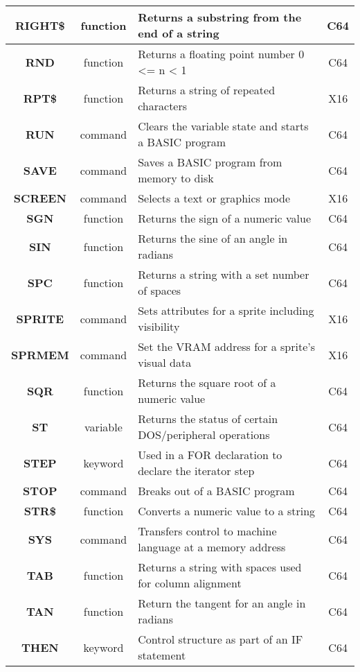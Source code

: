 \begin{longtable}{|c|c|m{4cm}|c|}
	{\bfseries RIGHT\$} & function & Returns a substring from the end of a string & C64 \\ \hline
	{\bfseries RND} & function & Returns a floating point number 0 <= n < 1 & C64 \\ \hline
	{\bfseries RPT\$} & function & Returns a string of repeated characters & X16 \\ \hline
	{\bfseries RUN} & command & Clears the variable state and starts a BASIC program & C64 \\ \hline
	{\bfseries SAVE} & command & Saves a BASIC program from memory to disk & C64 \\ \hline
	{\bfseries SCREEN} & command & Selects a text or graphics mode & X16 \\ \hline
	{\bfseries SGN} & function & Returns the sign of a numeric value & C64 \\ \hline
	{\bfseries SIN} & function & Returns the sine of an angle in radians & C64 \\ \hline
	{\bfseries SPC} & function & Returns a string with a set number of spaces & C64 \\ \hline
	{\bfseries SPRITE} & command & Sets attributes for a sprite including visibility & X16 \\ \hline
	{\bfseries SPRMEM} & command & Set the VRAM address for a sprite's visual data & X16 \\ \hline
	{\bfseries SQR} & function & Returns the square root of a numeric value & C64 \\ \hline
	{\bfseries ST} & variable & Returns the status of certain DOS/peripheral operations & C64 \\ \hline
	{\bfseries STEP} & keyword & Used in a {\ttfamily FOR} declaration to declare the iterator step & C64 \\ \hline
	{\bfseries STOP} & command & Breaks out of a BASIC program & C64 \\ \hline
	{\bfseries STR\$} & function & Converts a numeric value to a string & C64 \\ \hline
	{\bfseries SYS} & command & Transfers control to machine language at a memory address & C64 \\ \hline
	{\bfseries TAB} & function & Returns a string with spaces used for column alignment & C64 \\ \hline
	{\bfseries TAN} & function & Return the tangent for an angle in radians & C64 \\ \hline
	{\bfseries THEN} & keyword & Control structure as part of an {\ttfamily IF} statement & C64 \\ \hline

\end{longtable}
